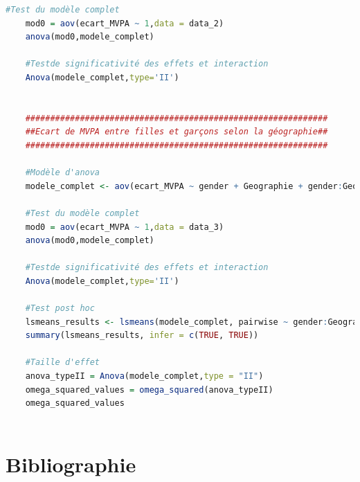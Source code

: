 \documentclass[12pt,a4paper]{article}
\renewcommand{\sectionmark}[1]{\markboth{#1}{}}
\begin{document}
\begin{lstlisting}[language=R]
	#Test du modèle complet
	mod0 = aov(ecart_MVPA ~ 1,data = data_2)
	anova(mod0,modele_complet)
	
	#Testde significativité des effets et interaction
	Anova(modele_complet,type='II')
	
	
	############################################################# 
	##Ecart de MVPA entre filles et garçons selon la géographie##
	#############################################################
	
	#Modèle d'anova
	modele_complet <- aov(ecart_MVPA ~ gender + Geographie + gender:Geographie,contrasts = list(gender = contr.sum,Geographie = contr.sum), data = data_3)
	
	#Test du modèle complet
	mod0 = aov(ecart_MVPA ~ 1,data = data_3)
	anova(mod0,modele_complet)
	
	#Testde significativité des effets et interaction
	Anova(modele_complet,type='II')
	
	#Test post hoc
	lsmeans_results <- lsmeans(modele_complet, pairwise ~ gender:Geographie, adjust='Tukey')
	summary(lsmeans_results, infer = c(TRUE, TRUE))
	
	#Taille d'effet
	anova_typeII = Anova(modele_complet,type = "II")
	omega_squared_values = omega_squared(anova_typeII)
	omega_squared_values
	
\end{lstlisting}
\newpage

\section*{Bibliographie}
\sectionmark{Bibliographie}
\nocite{*}
\printbibliography[heading=none]
\end{document}
